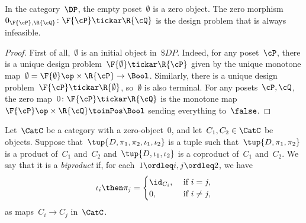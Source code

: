 \begin{lemma}
In the category~$\DP$, the empty poset~$\emptyset$ is a zero object. The zero morphism~$0_{\F{\cP},\R{\cQ}}\colon \F{\cP} \tickar \R{\cQ}$ is the design problem that is always infeasible.
\end{lemma}
\begin{proof}
    First of all,~$\emptyset$ is an initial object in~$\$DP$. Indeed, for any poset~$\cP $, there is a unique design problem~$\F{\emptyset} \tickar \R{\cP}$ given by the unique monotone map~$\emptyset=\F{\emptyset}\op\times \R{\cP} \to\Bool$. Similarly, there is a unique design problem~$\F{\cP} \tickar \R{\emptyset}$, so~$\emptyset$ is also terminal. For any posets~$\cP ,\cQ$, the zero map~$0 \colon \F{\cP} \tickar \R{\cQ}$ is the monotone map~$\F{\cP} \op\times \R{\cQ} \toinPos \Bool$ sending everything to~$\false$.
\end{proof}

\begin{shaded*}
\begin{definition}[Biproduct]
Let~$\CatC$ be a category with a zero-object~$0$, and let~$C_1,C_2\in\CatC$ be objects. Suppose that~$\tup{D,\pi_1,\pi_2,\iota_1,\iota_2}$ is a tuple such that~$\tup{D,\pi_1,\pi_2}$ is a product of~$C_1$ and~$C_2$ and~$\tup{D,\iota_1,\iota_2}$ is a coproduct of~$C_1$ and~$C_2$. We say that it is a \emph{biproduct} if, for each~$1\ordleq i,j\ordleq 2$, we have
\begin{equation}
\iota_i\then \pi_j=
\begin{cases}
	\id_{C_i}, &\text{ if }i=j,\\
	0, &\text{ if }i\neq j,
\end{cases} \label{eq:biproduct-condition}
\end{equation}
as maps~$C_i\to C_j$ in~$\CatC$.
\end{definition}
\end{shaded*}

